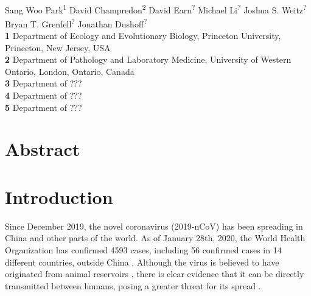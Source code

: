 \documentclass[12pt]{article}
\date{\today}
\begin{document}
\begin{flushleft}{
	\Large
	\textbf{}
}
\newline
\\
Sang Woo Park\textsuperscript{1}
David Champredon\textsuperscript{2}
David Earn\textsuperscript{?}
Michael Li\textsuperscript{?}
Joshua S. Weitz\textsuperscript{?}
Bryan T. Grenfell\textsuperscript{?}
Jonathan Dushoff\textsuperscript{?}
\\
\bigskip
\textbf{1} Department of Ecology and Evolutionary Biology, Princeton University, Princeton, New Jersey, USA
\\
\textbf{2} Department of Pathology and Laboratory Medicine, University of Western Ontario, London, Ontario, Canada
\\
\textbf{3} Department of ???
\\
\textbf{4} Department of ???
\\
\textbf{5} Department of ???
\\
\bigskip

\end{flushleft}

\section*{Abstract}

\pagebreak

\section{Introduction}

Since December 2019, the novel coronavirus (2019-nCoV) has been spreading in China and other parts of the world.
As of January 28th, 2020, the World Health Organization has confirmed 4593 cases, including 56 confirmed cases in 14 different countries, outside China \citep{who28report}.
Although the virus is believed to have originated from animal reservoirs \citep{cdcncov}, 
there is clear evidence that it can be directly transmitted between humans,
posing a greater threat for its spread \citep{huang2020clinical,who26report}.
\end{document}
